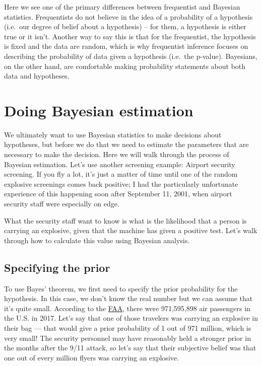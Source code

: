 \documentclass[12pt,]{book}
\theoremstyle{definition}
\theoremstyle{definition}
\theoremstyle{definition}
\theoremstyle{remark}
\begin{document}
Here we see one of the primary differences between frequentist and Bayesian statistics. Frequentists do not believe in the idea of a probability of a hypothesis (i.e.~our degree of belief about a hypothesis) -- for them, a hypothesis is either true or it isn't. Another way to say this is that for the frequentist, the hypothesis is fixed and the data are random, which is why frequentist inference focuses on describing the probability of data given a hypothesis (i.e.~the p-value). Bayesians, on the other hand, are comfortable making probability statements about both data and hypotheses.

\hypertarget{doing-bayesian-estimation}{%
\section{Doing Bayesian estimation}\label{doing-bayesian-estimation}}

We ultimately want to use Bayesian statistics to make decisions about hypotheses, but before we do that we need to estimate the parameters that are necessary to make the decision. Here we will walk through the process of Bayesian estimation. Let's use another screening example: Airport security screening. If you fly a lot, it's just a matter of time until one of the random explosive screenings comes back positive; I had the particularly unfortunate experience of this happening soon after September 11, 2001, when airport security staff were especially on edge.

What the security staff want to know is what is the likelihood that a person is carrying an explosive, given that the machine has given a positive test. Let's walk through how to calculate this value using Bayesian analysis.

\hypertarget{specifying-the-prior}{%
\subsection{Specifying the prior}\label{specifying-the-prior}}

To use Bayes' theorem, we first need to specify the prior probability for the hypothesis. In this case, we don't know the real number but we can assume that it's quite small. According to the \href{https://www.faa.gov/air_traffic/by_the_numbers/media/Air_Traffic_by_the_Numbers_2018.pdf}{FAA}, there were 971,595,898 air passengers in the U.S. in 2017. Let's say that one of those travelers was carrying an explosive in their bag --- that would give a prior probability of 1 out of 971 million, which is very small! The security personnel may have reasonably held a stronger prior in the months after the 9/11 attack, so let's say that their subjective belief was that one out of every million flyers was carrying an explosive.
\end{document}
